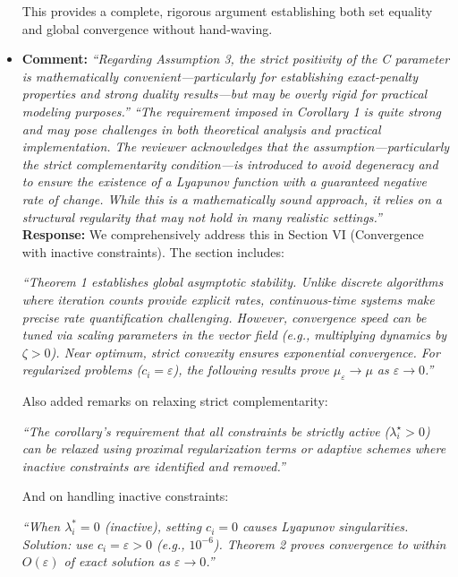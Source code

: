 \documentclass[journal,twoside,web]{ieeecolor}
\begin{document}
\begin{itemize}
This provides a complete, rigorous argument establishing both set equality and global convergence without hand-waving.\\

\item  \textbf{Comment:} \textit{``Regarding Assumption 3, the strict positivity of the C parameter is mathematically convenient—particularly for establishing exact-penalty properties and strong duality results—but may be overly rigid for practical modeling purposes.'' ``The requirement imposed in Corollary 1 is quite strong and may pose challenges in both theoretical analysis and practical implementation. The reviewer acknowledges that the assumption—particularly the strict complementarity condition—is introduced to avoid degeneracy and to ensure the existence of a Lyapunov function with a guaranteed negative rate of change. While this is a mathematically sound approach, it relies on a structural regularity that may not hold in many realistic settings.''}\\

\textbf{Response:} We comprehensively address this in Section VI (Convergence with inactive constraints). The section includes:

{\color{revisionblue}\textit{``Theorem 1 establishes global asymptotic stability. Unlike discrete algorithms where iteration counts provide explicit rates, continuous-time systems make precise rate quantification challenging. However, convergence speed can be tuned via scaling parameters in the vector field (e.g., multiplying dynamics by $\zeta > 0$). Near optimum, strict convexity ensures exponential convergence. For regularized problems ($c_i = \varepsilon$), the following results prove $\mu_\varepsilon \to \mu$ as $\varepsilon \to 0$.''}}

Also added remarks on relaxing strict complementarity:

{\color{revisionblue}\textit{``The corollary's requirement that all constraints be strictly active ($\lambda_i^\star > 0$) can be relaxed using proximal regularization terms or adaptive schemes where inactive constraints are identified and removed.''}}

And on handling inactive constraints:

{\color{revisionblue}\textit{``When $\lambda_i^* = 0$ (inactive), setting $c_i = 0$ causes Lyapunov singularities. Solution: use $c_i = \varepsilon > 0$ (e.g., $10^{-6}$). Theorem 2 proves convergence to within $O(\varepsilon)$ of exact solution as $\varepsilon \to 0$.''}}


\end{itemize}
\end{document}
